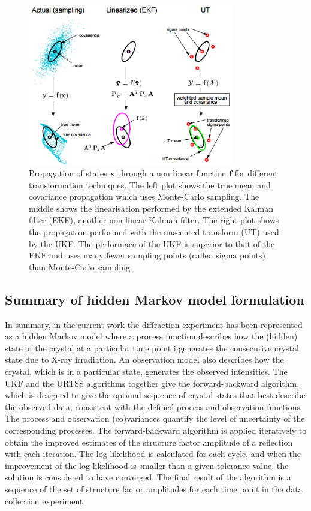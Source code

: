 \begin{figure}[ht!]
    \centering
    \includegraphics[width=0.8\textwidth]{figures/datared/StateTransformation.png}
    \caption[Propagation of states through a non linear function for different transformation techniques.]{Propagation of states $\mathbf{x}$ through a non linear function $\mathbf{f}$ for different transformation techniques.
    The left plot shows the true mean and covariance propagation which uses Monte-Carlo sampling.
    The middle shows the linearisation performed by the extended Kalman filter (EKF), another non-linear Kalman filter.
    The right plot shows the propagation performed with the unscented transform (UT) used by the UKF.
    The performace of the UKF is superior to that of the EKF and uses many fewer sampling points (called sigma points) than Monte-Carlo sampling.}
    \label{fig:State propagation for different filters}
\end{figure}

\subsection{Summary of hidden Markov model formulation}
\label{sub:Summary of hidden Markov model formulation}
In summary, in the current work the diffraction experiment has been represented as a hidden Markov model where a process function describes how the (hidden) state of the crystal at a particular time point i generates the consecutive crystal state due to X-ray irradiation.
An observation model also describes how the crystal, which is in a particular state, generates the observed intensities.
The UKF and the URTSS algorithms together give the forward-backward algorithm, which is designed to give the optimal sequence of crystal states that best describe the observed data, consistent with the defined process and observation functions.
The process and observation (co)variances quantify the level of uncertainty of the corresponding processes.
The forward-backward algorithm is applied iteratively to obtain the improved estimates of the structure factor amplitude of a reflection with each iteration.
The log likelihood is calculated for each cycle, and when the improvement of the log likelihood is smaller than a given tolerance value, the solution is considered to have converged.
The final result of the algorithm is a sequence of the set of structure factor amplitudes for each time point in the data collection experiment.
